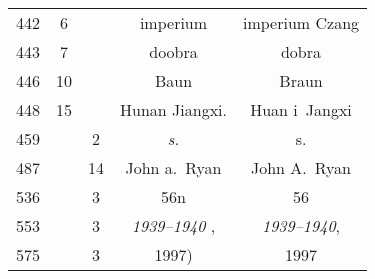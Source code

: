 \documentclass[a4paper,11pt]{article}  %
\begin{document}
\begin{center}
\begin{tabular}{|c|c|c|c|c|}
    442 &  6 & & imperium & imperium Czang \\
    443 &  7 & & doobra & dobra \\
    446 & 10 & & Baun & Braun \\
    448 & 15 & & Hunan Jiangxi. & Huan i~Jangxi \\
    459 & &  2 & \emph{s.} & s. \\
    487 & & 14 & John a.~Ryan & John A.~Ryan \\
    536 & &  3 & 56n & 56 \\
    553 & &  3 & \emph{1939--1940} , & \emph{1939--1940}, \\
    575 & &  3 & 1997) & 1997 \\
    \hline
  \end{tabular}


\end{center}
\end{document}
